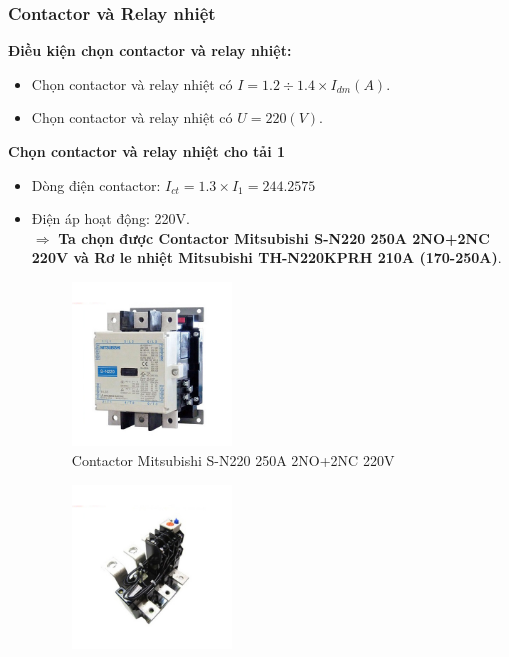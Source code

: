         \subsubsection{Contactor và Relay nhiệt}
            \textbf{Điều kiện chọn contactor và relay nhiệt:}
                \begin{itemize}
                    \item Chọn contactor và relay nhiệt có $I = 1.2 \div 1.4 \times I_{dm} (A)$.
                    \item Chọn contactor và relay nhiệt có $U = 220 (V)$.
                \end{itemize}
            \textbf{Chọn contactor và relay nhiệt cho tải 1}     
                \begin{itemize}
                    \item Dòng điện contactor: $I_{ct} = 1.3 \times I_{1} = 244.2575$
                    \item Điện áp hoạt động: 220V.\\[0.2cm]
                        $\Rightarrow$ \textbf{Ta chọn được Contactor Mitsubishi S-N220 250A 2NO+2NC 220V và Rơ le nhiệt Mitsubishi TH-N220KPRH 210A (170-250A)}.
                        \begin{figure}[H]
                            \centering
                            \includegraphics[width=0.4\textwidth]{pictures/2b1.png}
                            \caption{Contactor Mitsubishi S-N220 250A 2NO+2NC 220V}
                        \end{figure}
                        \begin{figure}[H]
                            \centering
                            \includegraphics[width=0.4\textwidth]{pictures/2b2.png}

\end{figure}
\end{itemize}
